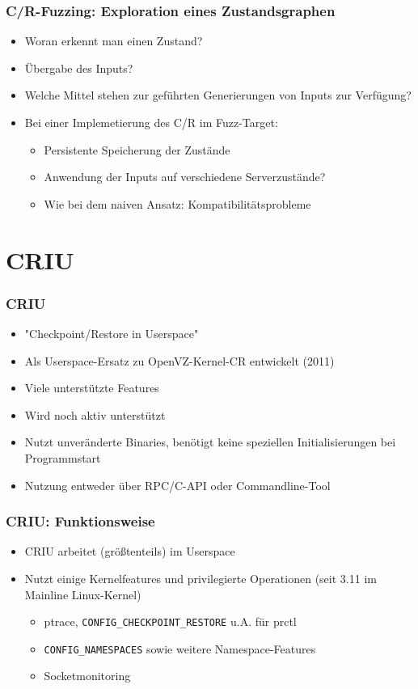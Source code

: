 \documentclass[handout]{beamer}
\begin{document}
\begin{frame}
    \frametitle{C/R-Fuzzing: Exploration eines Zustandsgraphen}
    \begin{itemize}
        \item Woran erkennt man einen Zustand?
        \item Übergabe des Inputs?
        \item Welche Mittel stehen zur geführten Generierungen von Inputs zur Verfügung?
        \item Bei einer Implemetierung des C/R im Fuzz-Target:
            \begin{itemize}
                \item Persistente Speicherung der Zustände
                \item Anwendung der Inputs auf verschiedene Serverzustände?
                \item Wie bei dem naiven Ansatz: Kompatibilitätsprobleme
            \end{itemize}
    \end{itemize}
\end{frame}

\section{CRIU}
\begin{frame}
    \frametitle{CRIU}
    \begin{itemize}
        \item "Checkpoint/Restore in Userspace"
        \item Als Userspace-Ersatz zu OpenVZ-Kernel-CR entwickelt (2011)
        \item Viele unterstützte Features
        \item Wird noch aktiv unterstützt
        \item Nutzt unveränderte Binaries, benötigt keine speziellen Initialisierungen bei Programmstart
        \item Nutzung entweder über RPC/C-API oder Commandline-Tool
    \end{itemize}
\end{frame}

\begin{frame}
    \frametitle{CRIU: Funktionsweise}
    \begin{itemize}
        \item CRIU arbeitet (größtenteils) im Userspace
        \item Nutzt einige Kernelfeatures und privilegierte Operationen (seit 3.11 im Mainline Linux-Kernel)
            \begin{itemize}
                \item ptrace, \texttt{CONFIG\_CHECKPOINT\_RESTORE} u.A. für prctl
                \item \texttt{CONFIG\_NAMESPACES} sowie weitere Namespace-Features
                \item Socketmonitoring
            \end{itemize}
    \end{itemize}
\end{frame}
\end{document}
